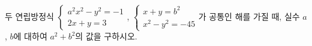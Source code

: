 두 연립방정식 $\begin{cases} a^2x^2-y^2=-1 \\ 2x+y=3 \end{cases}$, $\begin{cases} x+y=b^2 \\ x^2-y^2=-45 \end{cases}$가 공통인 해를 가질 때, 실수 $a$, $b$에 대하여 $a^2+b^2$의 값을 구하시오.
